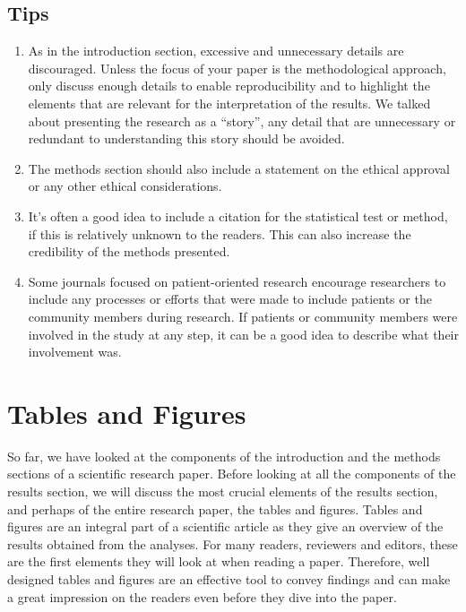 \documentclass[
]{book}
\providecommand{\tightlist}{%
  \setlength{\itemsep}{0pt}\setlength{\parskip}{0pt}}
\begin{document}
\hypertarget{tips-1}{%
\section{Tips}\label{tips-1}}

\begin{enumerate}
\def\labelenumi{\arabic{enumi}.}
\tightlist
\item
  As in the introduction section, excessive and unnecessary details are discouraged. Unless the focus of your paper is the methodological approach, only discuss enough details to enable reproducibility and to highlight the elements that are relevant for the interpretation of the results. We talked about presenting the research as a ``story'', any detail that are unnecessary or redundant to understanding this story should be avoided.
\item
  The methods section should also include a statement on the ethical approval or any other ethical considerations.
\item
  It's often a good idea to include a citation for the statistical test or method, if this is relatively unknown to the readers. This can also increase the credibility of the methods presented.
\item
  Some journals focused on patient-oriented research encourage researchers to include any processes or efforts that were made to include patients or the community members during research. If patients or community members were involved in the study at any step, it can be a good idea to describe what their involvement was.
\end{enumerate}

\hypertarget{tables-and-figures}{%
\chapter{Tables and Figures}\label{tables-and-figures}}

So far, we have looked at the components of the introduction and the methods sections of a scientific research paper. Before looking at all the components of the results section, we will discuss the most crucial elements of the results section, and perhaps of the entire research paper, the tables and figures. Tables and figures are an integral part of a scientific article as they give an overview of the results obtained from the analyses. For many readers, reviewers and editors, these are the first elements they will look at when reading a paper. Therefore, well designed tables and figures are an effective tool to convey findings and can make a great impression on the readers even before they dive into the paper.
\end{document}
